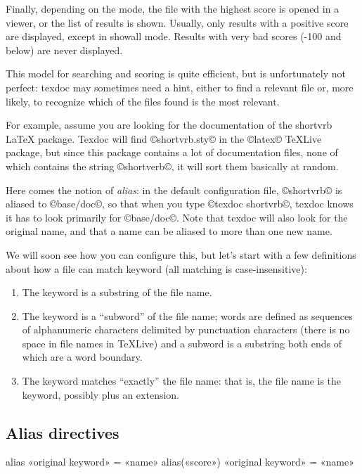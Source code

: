 \documentclass[a4paper, oneside]{scrartcl}
\makeatletter
\newcommand\texlive{%
  \TeX\thinspace Live\xspace}
\newcommand\latex{\LaTeX\xspace}
\newenvironment{htcode}{%
  \SaveVerbatim[samepage, gobble=2]{verbmat}%
  }{%
  \endSaveVerbatim
  \par\medskip\noindent\hspace*{\parindent}%
  \BUseVerbatim{verbmat}%
  \par\medskip\@endpetrue}
\makeatother
\begin{document}
Finally, depending on the mode, the file with the highest score is opened in a
viewer, or the list of results is shown. Usually, only results with a positive
score are displayed, except in showall mode. Results with very bad scores
(-100 and below) are never displayed.

\medskip

This model for searching and scoring is quite efficient, but is unfortunately
not perfect: texdoc may sometimes need a hint, either to find a relevant file
or, more likely, to recognize which of the files found is the most relevant.

For example, assume you are looking for the documentation of the shortvrb
\latex package. Texdoc will find ©shortvrb.sty© in the ©latex© \texlive
package, but since this package contains a lot of documentation files, none of
which contains the string ©shortverb©, it will sort them basically at random.

Here comes the notion of \emph{alias}: in the default configuration file,
©shortvrb© is aliased to ©base/doc©, so that when you type ©texdoc shortvrb©,
texdoc knows it has to look primarily for ©base/doc©. Note that texdoc will
also look for the original name, and that a name can be aliased to more than
one new name.

\medskip

We will soon see how you can configure this, but let's start with a few
definitions about how a file can match keyword (all matching is
case-insensitive):
\begin{enumerate}
  \item The keyword is a substring of the file name.
  \item The keyword is a ``subword'' of the file name; words are defined as
    sequences of alphanumeric characters delimited by punctuation characters
    (there is no space in file names in \texlive) and a subword is a
    substring both ends of which are a word boundary.
  \item The keyword matches ``exactly'' the file name: that is, the file
    name is the keyword, possibly plus an extension.
\end{enumerate}

\subsection{Alias directives}\label{ss-alias}

\begin{htcode}
  alias «original keyword» = «name»
  alias(«score») «original keyword» = «name»
\end{htcode}
\end{document}
